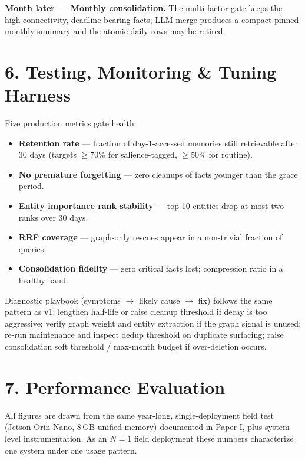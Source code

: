 \documentclass[]{article}
\begin{document}
\textbf{Month later --- Monthly consolidation.} The multi-factor gate
keeps the high-connectivity, deadline-bearing facts; LLM merge produces a
compact pinned monthly summary and the atomic daily rows may be retired.

\hypertarget{testing-monitoring-tuning-harness}{%
\section{\texorpdfstring{\textbf{6. Testing, Monitoring \& Tuning
Harness}}{6. Testing, Monitoring \& Tuning Harness}}\label{testing-monitoring-tuning-harness}}

Five production metrics gate health:

\begin{itemize}
\item \textbf{Retention rate} --- fraction of day-1-accessed memories still
  retrievable after 30 days (targets \(\ge70\%\) for salience-tagged,
  \(\ge50\%\) for routine).
\item \textbf{No premature forgetting} --- zero cleanups of facts younger
  than the grace period.
\item \textbf{Entity importance rank stability} --- top-10 entities drop
  at most two ranks over 30 days.
\item \textbf{RRF coverage} --- graph-only rescues appear in a non-trivial
  fraction of queries.
\item \textbf{Consolidation fidelity} --- zero critical facts lost;
  compression ratio in a healthy band.
\end{itemize}

Diagnostic playbook (symptoms \(\to\) likely cause \(\to\) fix) follows the
same pattern as v1: lengthen half-life or raise cleanup threshold if decay
is too aggressive; verify graph weight and entity extraction if the graph
signal is unused; re-run maintenance and inspect dedup threshold on
duplicate surfacing; raise consolidation soft threshold / max-month budget
if over-deletion occurs.

\hypertarget{performance-evaluation}{%
\section{\texorpdfstring{\textbf{7. Performance
Evaluation}}{7. Performance Evaluation}}\label{performance-evaluation}}

All figures are drawn from the same year-long, single-deployment field
test (Jetson Orin Nano, 8\,GB unified memory) documented in Paper I,
plus system-level instrumentation. As an \(N=1\) field deployment these
numbers characterize one system under one usage pattern.
\end{document}

